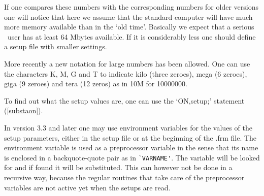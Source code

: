 If one compares these numbers with the corresponding numbers for older 
versions one will notice that here we assume that the standard computer 
will have much more memory available than in the `old time'. Basically we 
expect that a serious \FORM\ user has at least 64 Mbytes available. If it is 
considerably less one should define a setup file with smaller settings.

More recently a new notation for large numbers has been allowed. One can 
use the characters K, M, G and T to indicate kilo (three zeroes), mega (6 
zeroes), giga (9 zeroes) and tera (12 zeros) as in 10M for 10000000.

To find out what the setup values are, one can use the `ON,setup;' 
statement (\ref{substaon}).

In version 3.3 and later one may use environment 
variables for the values of the setup parameters, either in the setup file 
or at the beginning of the .frm file. The environment variable is used as a 
preprocessor variable in the sense that its name is enclosed in a 
backquote-quote pair as in \verb:`VARNAME':. The variable will be looked 
for and if found it will be substituted. This can however not be done in a 
recursive way, because the regular routines that take care of the 
preprocessor variables are not active yet when the setups are read.
